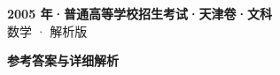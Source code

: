 \documentclass[zihao=-4, a4paper]{ctexart}
\begin{document}
\begin{center}
  {\Large\bfseries 2005 年·普通高等学校招生考试·天津卷·文科}\\[4pt]
  {\large 数学 · 解析版}
\end{center}
\medskip
{}

\clearpage
{}
\begin{center}{\Large\bfseries 参考答案与详细解析}\end{center}
\medskip

\end{document}

